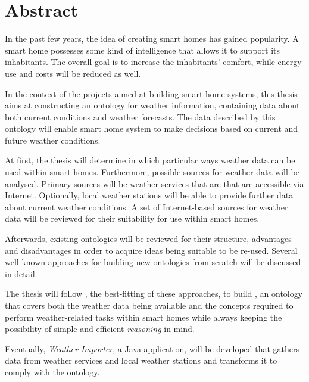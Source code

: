 \chapter*{Abstract}

In the past few years, the idea of creating smart homes has gained popularity. A smart home possesses some kind of intelligence that allows it to support its inhabitants. The overall goal is to increase the inhabitants' comfort, while energy use and costs will be reduced as well.

In the context of the projects aimed at building smart home systems, this thesis aims at constructing an  ontology for weather information, containing data about both current conditions and weather forecasts. The data described by this ontology will enable smart home system to make decisions based on current and future weather conditions.

At first, the thesis will determine in which particular ways weather data can be used within smart homes. Furthermore, possible sources for weather data will be analysed. Primary sources will be weather services that are that are accessible via Internet. Optionally, local weather stations will be able to provide further data about current weather conditions. A set of Internet-based sources for weather data will be reviewed for their suitability for use within smart homes.

Afterwards, existing ontologies will be reviewed for their structure, advantages and disadvantages in order to acquire ideas being suitable to be re-used. Several well-known approaches for building new ontologies from scratch will be discussed in detail.

The thesis will follow \methontology, the best-fitting of these approaches, to build \smarthomeweather, an  ontology that covers both the weather data being available and the concepts required to perform weather-related tasks within smart homes while always keeping the possibility of simple and efficient \emph{ reasoning} in mind.

Eventually, \emph{Weather Importer}, a Java application, will be developed that gathers data from weather services and local weather stations and transforms it to comply with the \smarthomeweather ontology.
